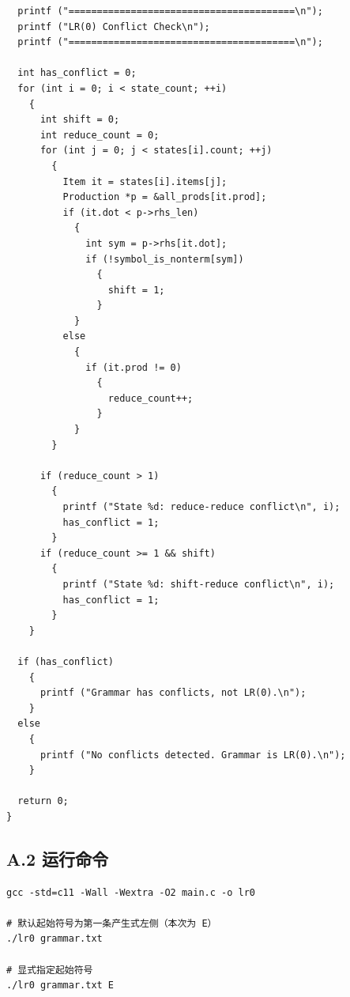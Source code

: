 \documentclass[12pt,a4paper]{ctexart}
\begin{document}
\begin{lstlisting}
  printf ("========================================\n");
  printf ("LR(0) Conflict Check\n");
  printf ("========================================\n");

  int has_conflict = 0;
  for (int i = 0; i < state_count; ++i)
    {
      int shift = 0;
      int reduce_count = 0;
      for (int j = 0; j < states[i].count; ++j)
        {
          Item it = states[i].items[j];
          Production *p = &all_prods[it.prod];
          if (it.dot < p->rhs_len)
            {
              int sym = p->rhs[it.dot];
              if (!symbol_is_nonterm[sym])
                {
                  shift = 1;
                }
            }
          else
            {
              if (it.prod != 0)
                {
                  reduce_count++;
                }
            }
        }

      if (reduce_count > 1)
        {
          printf ("State %d: reduce-reduce conflict\n", i);
          has_conflict = 1;
        }
      if (reduce_count >= 1 && shift)
        {
          printf ("State %d: shift-reduce conflict\n", i);
          has_conflict = 1;
        }
    }

  if (has_conflict)
    {
      printf ("Grammar has conflicts, not LR(0).\n");
    }
  else
    {
      printf ("No conflicts detected. Grammar is LR(0).\n");
    }

  return 0;
}
\end{lstlisting}


\subsection*{A.2 运行命令}
\begin{verbatim}
gcc -std=c11 -Wall -Wextra -O2 main.c -o lr0

# 默认起始符号为第一条产生式左侧（本次为 E）
./lr0 grammar.txt

# 显式指定起始符号
./lr0 grammar.txt E
\end{verbatim}
\end{document}

